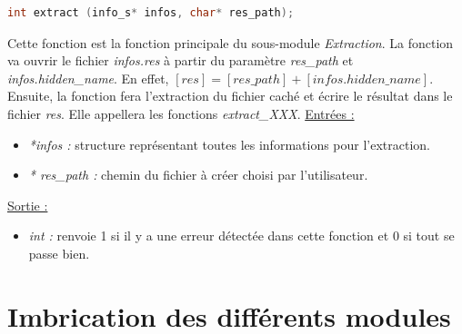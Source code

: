 \documentclass[11pt]{article}
\begin{document}


\begin{lstlisting}[language=c]
int extract (info_s* infos, char* res_path); 
\end{lstlisting}

Cette fonction est la fonction principale du sous-module \textit{Extraction}. 
La fonction va ouvrir le fichier \textit{infos.res} à partir du paramètre
\textit{res\_path} et \textit{infos.hidden\_name}. 
En effet, $[res] = [res\_path] + [infos.hidden\_name]$.
Ensuite, la fonction fera l'extraction du fichier caché et écrire le résultat 
dans le fichier \textit{res}. 
Elle appellera les fonctions \textit{extract\_XXX}. 
\newline
\underline{Entrées :} 
\begin{itemize}
\item \textit{*infos :} structure représentant toutes les informations pour 
l'extraction.  
\item \textit{* res\_path :} chemin du fichier à créer choisi par 
l'utilisateur. 
\end{itemize}
\underline{Sortie :} 
\begin{itemize}
\item \textit{int :} renvoie 1 si il y a une erreur détectée dans cette 
fonction et 0 si tout se passe bien.  
\newline 
\end{itemize}

\section{Imbrication des différents modules}
\end{document}
